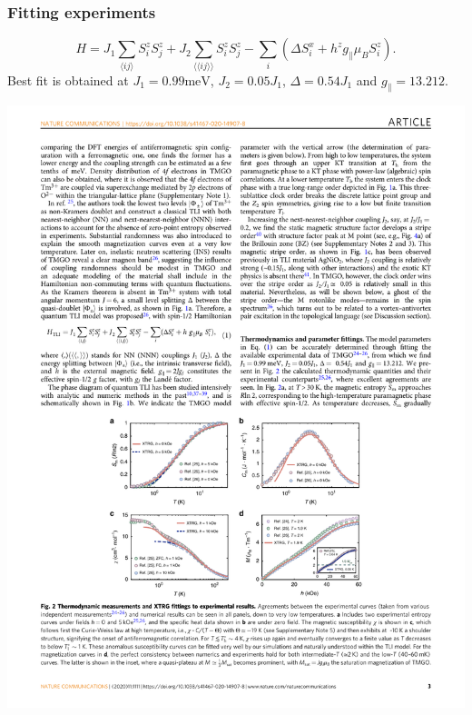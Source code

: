 \documentclass[xcolor=table, aspectratio=1610,ignorenonframetext]{beamer}
\begin{document}
\begin{frame}
  \frametitle{Fitting experiments}
  \[H = J_1\sum_{\langle ij\rangle}S_i^zS_j^z +J_2\sum_{\langle\langle ij\rangle\rangle}S_i^zS_j^z - \sum_i\left(\Delta S_i^x + h^zg_\parallel\mu_BS_i^z\right). \]
  Best fit is obtained at $J_1 = 0.99 \text{meV}$, $J_2 = 0.05J_1$,  $\Delta= 0.54J_1$ and $g_\parallel = 13.212$.
  \begin{center}
    \includegraphics[scale=.75]{thermal-fit}
  \end{center}
\end{frame}
\end{document}
